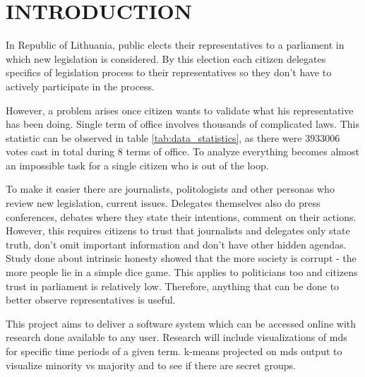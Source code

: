 \documentclass[a4paper,12pt]{article}
\begin{document}
	\clearpage
	
	\begingroup
	\singlespacing
	\tableofcontents
	\endgroup
	
	\clearpage
	
	\printglossary[type=\acronymtype,title={ACRONYMS}]
	
	\clearpage
	
	\printglossary[title={GLOSSARY}]
	
	\clearpage
	
	
	\section{INTRODUCTION}
	
	In Republic of Lithuania, public elects their representatives to a parliament in which new legislation is considered. By this election each citizen delegates specifics of legislation process to their representatives so they don't have to actively participate in the process.
	
	However, a problem arises once citizen wants to validate what his representative has been doing. Single term of office involves thousands of complicated laws. This statistic can be observed in table \ref{tab:data_statistics}, as there were $3933006$ votes cast in total during $8$ terms of office. To analyze everything becomes almost an impossible task for a single citizen who is out of the loop. 
	
	To make it easier there are journalists, politologists and other personas who review new legislation, current issues. Delegates themselves also do press conferences, debates where they state their intentions, comment on their actions. However, this requires citizens to trust that journalists and delegates only state truth, don't omit important information and don't have other hidden agendas. Study done about intrinsic honesty showed that the more society is corrupt - the more people lie in a simple dice game. This applies to politicians too and citizens trust in parliament is relatively low.  Therefore, anything that can be done to better observe representatives is useful.
	
	This project aims to deliver a software system which can be accessed online with research done available to any user. Research will include visualizations of \acrfull{mds} for specific time periods of a given term. \Gls{k-means} projected on \gls{mds} output to visualize minority vs majority and to see if there are secret groups.
	
\end{document}
